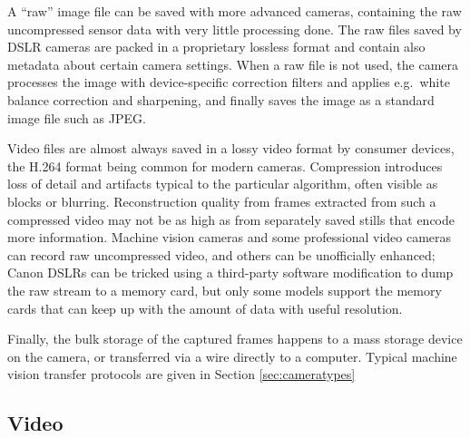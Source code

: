 

A ``raw'' image file can be saved with more advanced cameras, containing the raw uncompressed sensor data with very little processing done.
The raw files saved by DSLR cameras are packed in a proprietary lossless format and contain also metadata about certain camera settings.
When a raw file is not used, the camera processes the image with device-specific correction filters and applies e.g.~white balance correction and sharpening, and finally saves the image as a standard image file such as JPEG.
\cite{szeliski10vision}


Video files are almost always saved in a lossy video format by consumer devices, the H.264 format being common for modern cameras.
Compression introduces loss of detail and artifacts typical to the particular algorithm, often visible as blocks or blurring.
\cite{richardson2004h264}
Reconstruction quality from frames extracted from such a compressed video may not be as high as from separately saved stills that encode more information.
Machine vision cameras and some professional video cameras can record raw uncompressed video, and others can be unofficially enhanced;
Canon DSLRs can be tricked using a third-party software modification \cite{magiclantern} to dump the raw stream to a memory card, but only some models support the memory cards that can keep up with the amount of data with useful resolution.

Finally, the bulk storage of the captured frames happens to a mass storage device on the camera, or transferred via a wire directly to a computer.
\cite{hornberg2007handbook,ni2013choosing}
Typical machine vision transfer protocols are given in Section \ref{sec:cameratypes}


\subsection{Video} \label{sec:video} %

